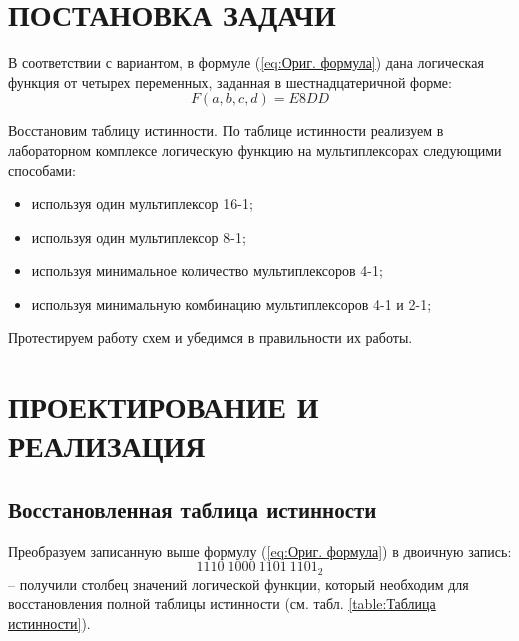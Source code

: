 \documentclass{mirea}
\author     {Краснов Н.O.}
\begin{document}
\chapter{ПОСТАНОВКА ЗАДАЧИ}
В соответствии с вариантом, в формуле (\ref{eq:Ориг. формула}) дана логическая функция от четырех переменных, заданная в шестнадцатеричной форме:
\begin{equation} \label{eq:Ориг. формула}
	F(a,b,c,d)=E8DD
\end{equation}

Восстановим таблицу истинности. По таблице истинности реализуем в лабораторном комплексе логическую функцию на мультиплексорах следующими способами:

\begin{itemize}
	\item используя один мультиплексор 16-1;
	\item используя один мультиплексор 8-1;
	\item используя минимальное количество мультиплексоров 4-1;
	\item используя минимальную комбинацию мультиплексоров 4-1 и 2-1;
\end{itemize}

Протестируем работу схем и убедимся в правильности их работы.

\chapter{ПРОЕКТИРОВАНИЕ И РЕАЛИЗАЦИЯ}
\section{Восстановленная таблица истинности}
Преобразуем записанную выше формулу (\ref{eq:Ориг. формула}) в двоичную запись:
\[1110\ 1000\ 1101\ 1101_{2}\] – получили столбец значений логической функции, который необходим для восстановления полной таблицы истинности (см. табл. \ref{table:Таблица истинности}).
\end{document}
